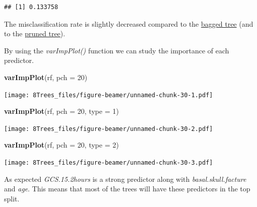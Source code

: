 \documentclass[10pt,ignorenonframetext,]{beamer}
\newenvironment{Shaded}{\begin{snugshade}}{\end{snugshade}}
\newcommand{\KeywordTok}[1]{\textcolor[rgb]{0.13,0.29,0.53}{\textbf{#1}}}
\newcommand{\DataTypeTok}[1]{\textcolor[rgb]{0.13,0.29,0.53}{#1}}
\newcommand{\DecValTok}[1]{\textcolor[rgb]{0.00,0.00,0.81}{#1}}
\newcommand{\NormalTok}[1]{#1}
\begin{document}
\begin{frame}[fragile]
\begin{verbatim}
## [1] 0.133758
\end{verbatim}

\normalsize

The misclassification rate is slightly decreased compared to the
\href{bagex}{bagged tree} (and to the \href{expruning}{pruned tree}).

\end{frame}

\begin{frame}[fragile]

By using the \emph{varImpPlot()} function we can study the importance of
each predictor.

\begin{Shaded}
\begin{Highlighting}[]
\KeywordTok{varImpPlot}\NormalTok{(rf, }\DataTypeTok{pch =} \DecValTok{20}\NormalTok{)}
\end{Highlighting}
\end{Shaded}

\texttt{[image: 8Trees\_files/figure-beamer/unnamed-chunk-30-1.pdf]}

\begin{Shaded}
\begin{Highlighting}[]
\KeywordTok{varImpPlot}\NormalTok{(rf, }\DataTypeTok{pch =} \DecValTok{20}\NormalTok{, }\DataTypeTok{type =} \DecValTok{1}\NormalTok{)}
\end{Highlighting}
\end{Shaded}

\texttt{[image: 8Trees\_files/figure-beamer/unnamed-chunk-30-2.pdf]}

\begin{Shaded}
\begin{Highlighting}[]
\KeywordTok{varImpPlot}\NormalTok{(rf, }\DataTypeTok{pch =} \DecValTok{20}\NormalTok{, }\DataTypeTok{type =} \DecValTok{2}\NormalTok{)}
\end{Highlighting}
\end{Shaded}

\texttt{[image: 8Trees\_files/figure-beamer/unnamed-chunk-30-3.pdf]}

As expected \emph{GCS.15.2hours} is a strong predictor along with
\emph{basal.skull.facture} and \emph{age}. This means that most of the
trees will have these predictors in the top split.

\end{frame}
\end{document}
